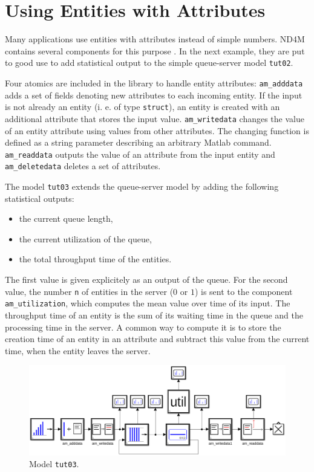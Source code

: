 \documentclass[12pt,oneside,a4paper,bibtotoc,BCOR=0pt,DIV=20]{scrreprt}
\newcommand{\cft}[1]{\mbox{\texttt{#1}}}   %
\begin{document}
\chapter{Using Entities with Attributes}

Many applications use entities with attributes instead of simple numbers. ND4M
contains several components for this purpose \cite{nsaInvitation}. In the next
example, they are put to good use to add statistical output to the simple
queue-server model \cft{tut02}.

Four atomics are included in the library to handle entity attributes:
\cft{am\_adddata} adds a set of fields denoting new attributes to each incoming
entity. If the input is not already an entity (i. e. of type \cft{struct}), an
entity is created with an additional attribute that stores the input
value. \cft{am\_writedata} changes the value of an entity attribute using
values from other attributes. The changing function is defined as a string
parameter describing an arbitrary Matlab command. \cft{am\_readdata} outputs
the value of an attribute from the input entity and \cft{am\_deletedata}
deletes a set of attributes.

The model \cft{tut03} extends the queue-server model by adding the following
statistical outputs:
\begin{itemize}
\item the current queue length,
\item the current utilization of the queue,
\item the total throughput time of the entities.
\end{itemize}
The first value is given explicitely as an output of the queue. For the second
value, the number \cft{n} of entities in the server ($0$ or $1$) is sent to the
component \cft{am\_utilization}, which computes the mean value over time of its
input. The throughput time of an entity is the sum of its waiting time in the
queue and the processing time in the server. A common way to compute it is to
store the creation time of an entity in an attribute and subtract this value
from the current time, when the entity leaves the server.
\begin{figure}[ht]
\centering
\includegraphics[width=0.81\columnwidth]{images/bild06.pdf}
\caption{Model \cft{tut03}.}
\label{fig_6}
\end{figure}
\end{document}
